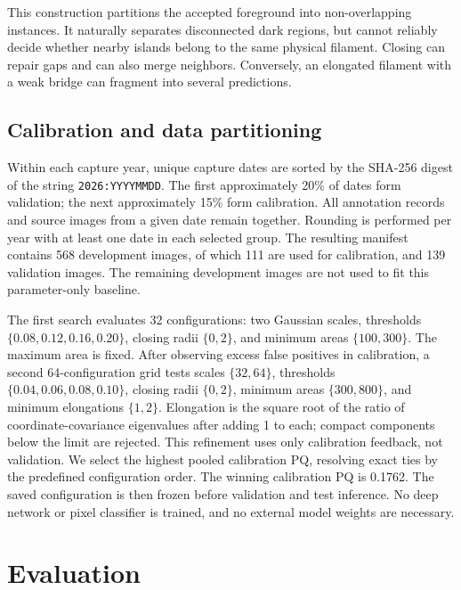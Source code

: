 \documentclass[sigconf]{acmart}
\begin{document}
This construction partitions the accepted foreground into non-overlapping instances. It naturally separates disconnected dark regions, but cannot reliably decide whether nearby islands belong to the same physical filament. Closing can repair gaps and can also merge neighbors. Conversely, an elongated filament with a weak bridge can fragment into several predictions.

\subsection{Calibration and data partitioning}
Within each capture year, unique capture dates are sorted by the SHA-256 digest of the string \texttt{2026:YYYYMMDD}. The first approximately 20\% of dates form validation; the next approximately 15\% form calibration. All annotation records and source images from a given date remain together. Rounding is performed per year with at least one date in each selected group. The resulting manifest contains 568 development images, of which 111 are used for calibration, and 139 validation images. The remaining development images are not used to fit this parameter-only baseline.

The first search evaluates 32 configurations: two Gaussian scales, thresholds $\{0.08,0.12,0.16,0.20\}$, closing radii $\{0,2\}$, and minimum areas $\{100,300\}$. The maximum area is fixed. After observing excess false positives in calibration, a second 64-configuration grid tests scales $\{32,64\}$, thresholds $\{0.04,0.06,0.08,0.10\}$, closing radii $\{0,2\}$, minimum areas $\{300,800\}$, and minimum elongations $\{1,2\}$. Elongation is the square root of the ratio of coordinate-covariance eigenvalues after adding 1 to each; compact components below the limit are rejected. This refinement uses only calibration feedback, not validation. We select the highest pooled calibration PQ, resolving exact ties by the predefined configuration order. The winning calibration PQ is 0.1762. The saved configuration is then frozen before validation and test inference. No deep network or pixel classifier is trained, and no external model weights are necessary.

\section{Evaluation}\label{sec:evaluation}
\end{document}
